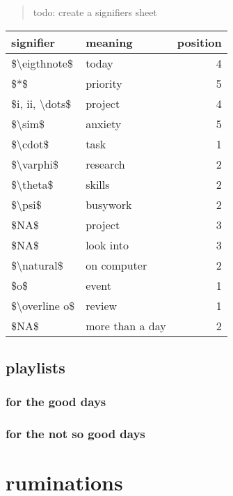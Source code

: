 \documentclass[]{book}
\begin{document}
\begin{quote}
todo: create a signifiers sheet
\end{quote}

\begin{tabular}{l|l|r}
\hline
signifier & meaning & position\\
\hline
\$\textbackslash{}eigthnote\$ & today & 4\\
\hline
\$*\$ & priority & 5\\
\hline
\$i, ii, \textbackslash{}dots\$ & project & 4\\
\hline
\$\textbackslash{}sim\$ & anxiety & 5\\
\hline
\$\textbackslash{}cdot\$ & task & 1\\
\hline
\$\textbackslash{}varphi\$ & research & 2\\
\hline
\$\textbackslash{}theta\$ & skills & 2\\
\hline
\$\textbackslash{}psi\$ & busywork & 2\\
\hline
\$NA\$ & project & 3\\
\hline
\$NA\$ & look into & 3\\
\hline
\$\textbackslash{}natural\$ & on computer & 2\\
\hline
\$o\$ & event & 1\\
\hline
\$\textbackslash{}overline o\$ & review & 1\\
\hline
\$NA\$ & more than a day & 2\\
\hline
\end{tabular}

\hypertarget{playlists}{%
\section{playlists}\label{playlists}}

\hypertarget{for-the-good-days}{%
\subsection{for the good days}\label{for-the-good-days}}

\hypertarget{for-the-not-so-good-days}{%
\subsection{for the not so good days}\label{for-the-not-so-good-days}}

\hypertarget{ruminations}{%
\chapter{ruminations}\label{ruminations}}
\end{document}
